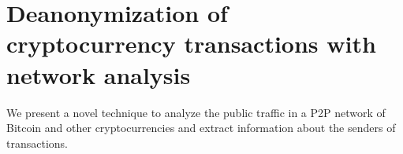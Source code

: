 \chapter{Deanonymization of cryptocurrency transactions with network analysis} %

\label{Chapter03_Clustering}

We present a novel technique to analyze the public traffic in a P2P network of Bitcoin and other cryptocurrencies and extract information about the senders of transactions.